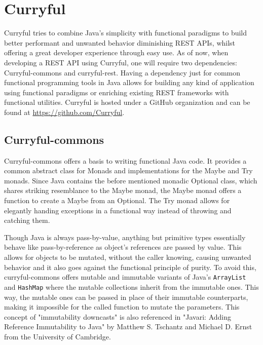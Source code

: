 \documentclass[a4paper,titlepage]{article}
\begin{document}
\section{Curryful}
Curryful tries to combine Java's simplicity with functional paradigms to build
better performant and unwanted behavior diminishing REST APIs, whilst offering
a great developer experience through easy use. As of now, when developing a REST
API using Curryful, one will require two dependencies: Curryful-commons and
curryful-rest. Having a dependency just for common functional programming tools
in Java allows for building any kind of application using functional paradigms
or enriching existing REST frameworks with functional utilities. Curryful is
hosted under a GitHub organization and can be found at
\url{https://github.com/Curryful}.

\subsection{Curryful-commons}
Curryful-commons offers a basis to writing functional Java code. It provides a
common abstract class for Monads and implementations for the Maybe and Try
monads. Since Java contains the before mentioned monadic Optional class, which
shares striking resemblance to the Maybe monad, the Maybe monad offers a
function to create a Maybe from an Optional. The Try monad allows for elegantly
handing exceptions in a functional way instead of throwing and catching them.

Though Java is always pass-by-value, anything but primitive types essentially
behave like pass-by-reference as object's references are passed by value.
\cite{hott2024java} This allows for objects to be mutated, without the caller
knowing, causing unwanted behavior and it also goes against the functional
principle of purity. To avoid this, curryful-commons offers mutable and
immutable variants of Java's \verb|ArrayList| and \verb|HashMap| where the
mutable collections inherit from the immutable ones. This way, the mutable ones
can be passed in place of their immutable counterparts, making it impossible for
the called function to mutate the parameters. This concept of "immutability
downcasts" is also referenced in "Javari: Adding Reference Immutability to Java"
\cite{tschantz2005javari} by Matthew S. Tschantz and Michael D. Ernst from the
University of Cambridge.
\end{document}

